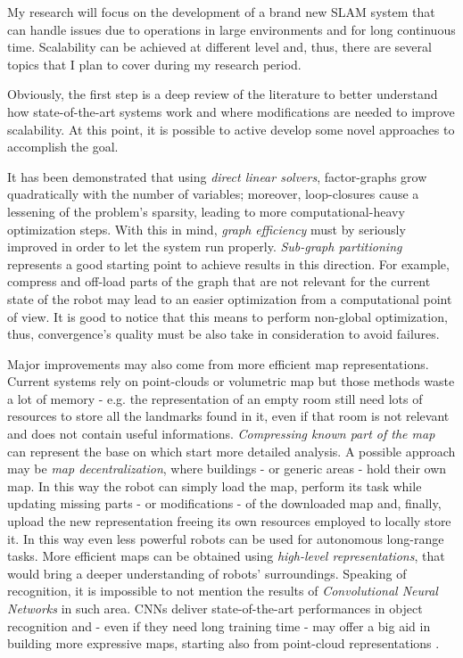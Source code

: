 \documentclass[10pt,a4paper, notitlepage]{report}
\begin{document}
My research will focus on the development of a brand new SLAM system that can handle issues due to operations in large environments and for long continuous time. Scalability can be achieved at different level and, thus, there are several topics that I plan to cover during my research period.

Obviously, the first step is a deep review of the literature to better understand how state-of-the-art systems work and where modifications are needed to improve scalability. At this point, it is possible to active develop some novel approaches to accomplish the goal.

It has been demonstrated that using \textit{direct linear solvers}, factor-graphs grow quadratically with the number of variables; moreover, loop-closures cause a lessening of the problem's sparsity, leading to more computational-heavy optimization steps. With this in mind, \textit{graph efficiency} must by seriously improved in order to let the system run properly. \textit{Sub-graph partitioning} \cite{grisetti2012condensed-m} represents a good starting point to achieve results in this direction. For example, compress and off-load parts of the graph that are not relevant for the current state of the robot may lead to an easier optimization from a computational point of view. It is good to notice that this means to perform non-global optimization, thus, convergence's quality must be also take in consideration to avoid failures.

Major improvements may also come from more efficient map representations. Current systems rely on point-clouds or volumetric map but those methods waste a lot of memory - e.g. the representation of an empty room still need lots of resources to store all the landmarks found in it, even if that room is not relevant and does not contain useful informations. \textit{Compressing known part of the map} \cite{lynen2015getoutofmylab} can represent the base on which start more detailed analysis. A possible approach may be \textit{map decentralization}, where buildings - or generic areas - hold their own map. In this way the robot can simply load the map, perform its task while updating missing parts - or modifications - of the downloaded map and, finally, upload the new representation freeing its own resources employed to locally store it. In this way even less powerful robots can be used for autonomous long-range tasks. More efficient maps can be obtained using \textit{high-level representations}, that would bring a deeper understanding of robots' surroundings. Speaking of recognition, it is impossible to not mention the results of \textit{Convolutional Neural Networks} \cite{krizhevsky2012alexnet} in such area. CNNs deliver state-of-the-art performances in object recognition and - even if they need long training time - may offer a big aid in building more expressive maps, starting also from point-cloud representations \cite{maturana2015voxnet}.
\end{document}
